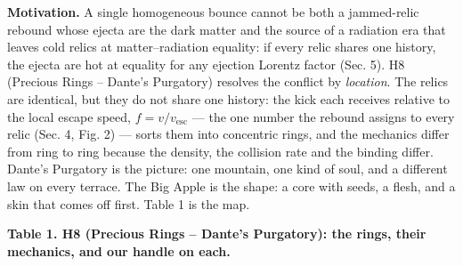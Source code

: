 \documentclass[
  11pt,
]{article}
\begin{document}
\textbf{Motivation.} A single homogeneous bounce cannot be both a
jammed-relic rebound whose ejecta are the dark matter and the source of
a radiation era that leaves cold relics at matter--radiation equality:
if every relic shares one history, the ejecta are hot at equality for
any ejection Lorentz factor (Sec. 5). H8 (Precious Rings -- Dante's
Purgatory) resolves the conflict by \emph{location}. The relics are
identical, but they do not share one history: the kick each receives
relative to the local escape speed, \(f = v/v_{\text{esc}}\) --- the one
number the rebound assigns to every relic (Sec. 4, Fig. 2) --- sorts
them into concentric rings, and the mechanics differ from ring to ring
because the density, the collision rate and the binding differ. Dante's
Purgatory is the picture: one mountain, one kind of soul, and a
different law on every terrace. The Big Apple is the shape: a core with
seeds, a flesh, and a skin that comes off first. Table 1 is the map.

\textbf{Table 1. H8 (Precious Rings -- Dante's Purgatory): the rings,
their mechanics, and our handle on each.}
\end{document}
